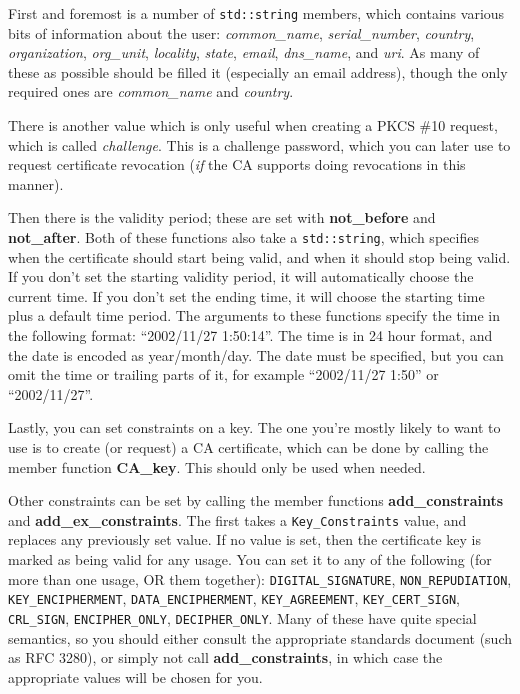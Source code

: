 \documentclass{article}
\newcommand{\function}[1]{\textbf{#1}}
\newcommand{\type}[1]{\texttt{#1}}
\renewcommand{\arg}[1]{\textsl{#1}}
\begin{document}
First and foremost is a number of \type{std::string} members, which contains
various bits of information about the user: \arg{common\_name},
\arg{serial\_number}, \arg{country}, \arg{organization}, \arg{org\_unit},
\arg{locality}, \arg{state}, \arg{email}, \arg{dns\_name}, and \arg{uri}. As
many of these as possible should be filled it (especially an email address),
though the only required ones are \arg{common\_name} and \arg{country}.

There is another value which is only useful when creating a PKCS \#10 request,
which is called \arg{challenge}. This is a challenge password, which you can
later use to request certificate revocation (\emph{if} the CA supports doing
revocations in this manner).

Then there is the validity period; these are set with \function{not\_before}
and \function{not\_after}. Both of these functions also take a
\type{std::string}, which specifies when the certificate should start being
valid, and when it should stop being valid. If you don't set the starting
validity period, it will automatically choose the current time. If you don't
set the ending time, it will choose the starting time plus a default time
period. The arguments to these functions specify the time in the following
format: ``2002/11/27 1:50:14''. The time is in 24 hour format, and the date is
encoded as year/month/day. The date must be specified, but you can omit the
time or trailing parts of it, for example ``2002/11/27 1:50'' or
``2002/11/27''.

Lastly, you can set constraints on a key. The one you're mostly likely to want
to use is to create (or request) a CA certificate, which can be done by calling
the member function \function{CA\_key}. This should only be used when needed.

Other constraints can be set by calling the member functions
\function{add\_constraints} and \function{add\_ex\_constraints}. The first
takes a \type{Key\_Constraints} value, and replaces any previously set
value. If no value is set, then the certificate key is marked as being valid
for any usage.  You can set it to any of the following (for more than one
usage, OR them together): \type{DIGITAL\_SIGNATURE}, \type{NON\_REPUDIATION},
\type{KEY\_ENCIPHERMENT}, \type{DATA\_ENCIPHERMENT}, \type{KEY\_AGREEMENT},
\type{KEY\_CERT\_SIGN}, \type{CRL\_SIGN}, \type{ENCIPHER\_ONLY},
\type{DECIPHER\_ONLY}. Many of these have quite special semantics, so you
should either consult the appropriate standards document (such as RFC 3280), or
simply not call \function{add\_constraints}, in which case the appropriate
values will be chosen for you.
\end{document}
